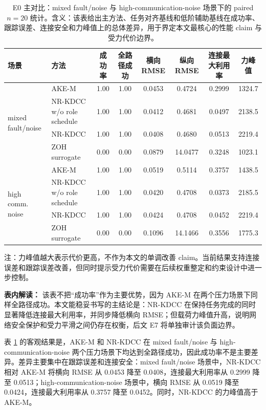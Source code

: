 \documentclass[twocolumn,3p,times,procedia]{elsarticle}
\newcommand{\AKE}{AKE-M}
\newcommand{\Method}{NR-KDCC}
\newcommand{\TF}{\Method{}}
\begin{document}
\begin{table}[!t]
\centering
\caption{E0 主对比：mixed fault/noise 与 high-communication-noise 场景下的 paired $n=20$ 统计。含义：该表给出主方法、任务对齐基线和低阶辅助基线在成功率、跟踪误差、连接安全和力峰值上的总体差异，用于界定本文最核心的性能 claim 与受力代价边界。}
\label{tab:e0_main}
\footnotesize
\begin{tabular}{llcccccc}
\toprule
场景 & 方法 & 成功率 & 全路径成功 & 横向 RMSE & 纵向 RMSE & 连接最大利用率 & 力峰值 \\
\midrule
\multirow{4}{*}{mixed fault/noise}
& \AKE{} & 1.00 & 1.00 & 0.0453 & 0.4724 & 0.2999 & 1324.7\\
& \Method{} w/o role schedule & 1.00 & 1.00 & 0.0412 & 0.4681 & 0.0497 & 2138.5\\
& \TF{} & 1.00 & 1.00 & 0.0408 & 0.4680 & 0.0513 & 2219.4\\
& ZOH surrogate & 0.00 & 0.00 & 0.0879 & 14.0477 & 0.3248 & 1023.1\\
\midrule
\multirow{4}{*}{high comm. noise}
& \AKE{} & 1.00 & 1.00 & 0.0519 & 0.5114 & 0.3757 & 1438.5\\
& \Method{} w/o role schedule & 1.00 & 1.00 & 0.0420 & 0.4708 & 0.0373 & 2185.5\\
& \TF{} & 1.00 & 1.00 & 0.0424 & 0.4708 & 0.0452 & 2219.4\\
& ZOH surrogate & 0.00 & 0.00 & 0.1096 & 14.1466 & 0.3556 & 1775.3\\
\bottomrule
\end{tabular}
\begin{tablenotes}
\footnotesize
\item 注：力峰值越大表示代价更高，不作为本文的单调改善 claim。当前结果支持连接误差和跟踪误差改善，但同时提示受力代价需要在后续权重整定和约束设计中进一步控制。
\end{tablenotes}
\vspace{1.5mm}
\begin{minipage}{0.93\textwidth}
\footnotesize
\textbf{表内解读：} 该表不把“成功率”作为主要优势，因为 \AKE{} 在两个压力场景下同样全路径成功。本文能稳妥书写的主结论是：\Method{} 在保持任务完成的同时显著降低连接最大利用率，并同步降低横向 RMSE；但载荷力峰值升高，说明网络安全保护和受力平滑之间仍存在权衡，后文 E7 将单独审计该负面边界。
\end{minipage}
\end{table}

表 \ref{tab:e0_main} 的客观结果是，\AKE{} 和 \Method{} 在 mixed fault/noise 与 high-communication-noise 两个压力场景下均达到全路径成功，因此成功率不是主要差异。差异主要集中在跟踪误差和连接安全：mixed fault/noise 场景中，\Method{} 相对 \AKE{} 将横向 RMSE 从 0.0453 降至 0.0408，连接最大利用率从 0.2999 降至 0.0513；high-communication-noise 场景中，横向 RMSE 从 0.0519 降至 0.0424，连接最大利用率从 0.3757 降至 0.0452。同时，\Method{} 的力峰值高于 \AKE{}。
\end{document}
